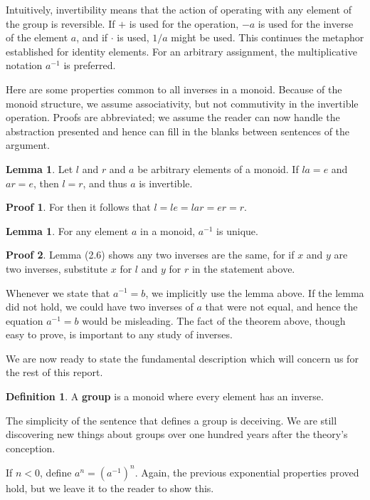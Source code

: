 \documentclass[12pt]{amsbook}
\theoremstyle{definition}
\newtheorem{lemma}[theorem]{Lemma}
\newtheorem{definition}{Definition}
\newtheorem*{prf}{Proof}
\begin{document}
Intuitively, invertibility means that the action of operating with any element of the group is reversible. If $+$ is used for the operation, $-a$ is used for the inverse of the element $a$, and if $\cdotp$ is used, $1/a$ might be used. This continues the metaphor established for identity elements. For an arbitrary assignment, the multiplicative notation  $a^{-1}$ is preferred.

Here are some properties common to all inverses in a monoid. Because of the monoid structure, we assume associativity, but not commutivity in the invertible operation. Proofs are abbreviated; we assume the reader can now handle the abstraction presented and hence can fill in the blanks between sentences of the argument.

\begin{lemma} Let $l$ and $r$ and $a$ be arbitrary elements of a monoid. If $la = e$ and $ar = e$, then $l = r$, and thus $a$ is invertible. \end{lemma}
\begin{prf} For then it follows that $l = le = lar = er = r$. \end{prf}

\begin{lemma} For any element $a$ in a monoid, $a^{-1}$ is unique. \end{lemma}
\begin{prf} Lemma (2.6) shows any two inverses are the same, for if $x$ and $y$ are two inverses, substitute $x$ for $l$ and $y$ for $r$ in the statement above. \end{prf}

Whenever we state that $a^{-1} = b$, we implicitly use the lemma above. If the lemma did not hold, we could have two inverses of $a$ that were not equal, and hence the equation $a^{-1} = b$ would be misleading. The fact of the theorem above, though easy to prove, is important to any study of inverses.

We are now ready to state the fundamental description which will concern us for the rest of this report.

\begin{definition}
    A {\bf group} is a monoid where every element has an inverse.
\end{definition}

The simplicity of the sentence that defines a group is deceiving. We are still discovering new things about groups over one hundred years after the theory's conception.

If $n < 0$, define $a^n = (a^{-1})^{n}$. Again, the previous exponential properties proved hold, but we leave it to the reader to show this.
\end{document}
